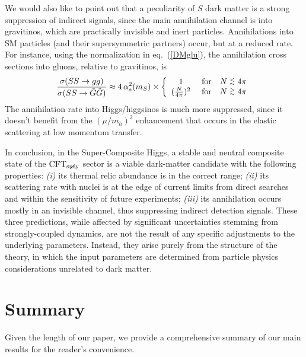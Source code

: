 \documentclass[a4paper,12pt]{article}
\newcommand{\lsim}{\stackrel{<}{_\sim}}
\newcommand{\gsim}{\stackrel{>}{_\sim}}
\newcommand{\beq}{\begin{equation}}
\newcommand{\eeq}{\end{equation}}
\def\eq#1{eq.~(\ref{#1})}
\def\eq#1{eq.~(\ref{#1})}
\def\mS{m_S}
\def\CFTs{{\rm CFT}_ {{\rm susy}\! \! \! \! \! \! \! \!\diagup \,\,\,}}
\begin{document}
{{{{We would also like to point out that a peculiarity of $S$ dark matter is a strong suppression of indirect signals, since the main annihilation channel is into gravitinos, which are practically invisible and inert particles. Annihilations into SM particles (and their supersymmetric partners) occur, but at a reduced rate. For instance, using the normalization in \eq{DMglu}, the annihilation cross sections into gluons, relative to gravitinos, is
\beq
\frac{\sigma(SS\to gg)}{\sigma(SS\to \tilde G\tilde G )}\approx 
4\, \alpha_s^2(\mS) 
\times \left\{
\begin{array}{cl}
1 & ~{\rm for}~~~N\lsim  4\pi \\
( \frac{N}{4\pi})^2& ~ {\rm for}~~~N\gsim  4\pi
\end{array} 
\right.
\eeq
The annihilation rate into Higgs/higgsinos is much more suppressed, since it doesn't benefit from the $(\mu/ m_h)^2$ enhancement that occurs in the elastic scattering at low momentum transfer. 

In conclusion, in the Super-Composite Higgs, a stable and neutral composite state of the $\CFTs$ sector is a viable dark-matter candidate with the following properties: {\it (i)} its thermal relic abundance is in the correct range; {\it (ii)} its scattering rate with nuclei is at the edge of current limits from direct searches and within the sensitivity of future experiments; {\it (iii)} its annihilation occurs mostly in an invisible channel, thus suppressing indirect detection signals. These three predictions, while affected by significant uncertainties stemming from strongly-coupled dynamics, are not the result of any specific adjustments to the underlying parameters. Instead, they arise purely from the structure of the theory, in which the input parameters are determined from particle physics considerations unrelated to dark matter.


\boldmath
\section{Summary}
\unboldmath
\label{sec:conc}

Given the length of our paper, we provide a comprehensive summary of our main results for the reader's convenience.

}}}}
\end{document}
